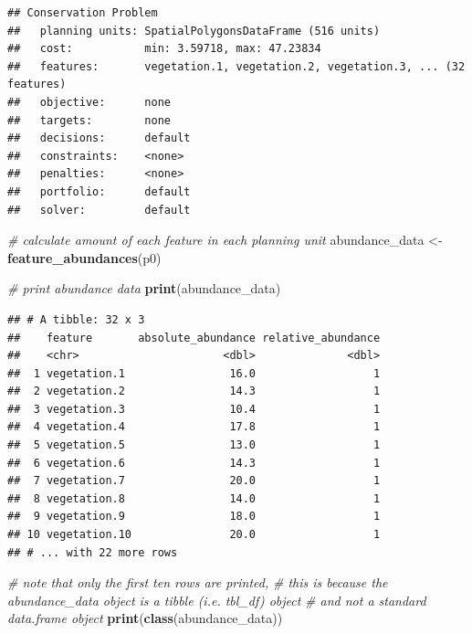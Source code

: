 \documentclass[
  12pt,
]{book}
\newenvironment{Shaded}{\begin{snugshade}}{\end{snugshade}}
\newcommand{\CommentTok}[1]{\textcolor[rgb]{0.56,0.35,0.01}{\textit{#1}}}
\newcommand{\KeywordTok}[1]{\textcolor[rgb]{0.13,0.29,0.53}{\textbf{#1}}}
\newcommand{\NormalTok}[1]{#1}
\newcommand{\StringTok}[1]{\textcolor[rgb]{0.31,0.60,0.02}{#1}}
\begin{document}
\begin{verbatim}
## Conservation Problem
##   planning units: SpatialPolygonsDataFrame (516 units)
##   cost:           min: 3.59718, max: 47.23834
##   features:       vegetation.1, vegetation.2, vegetation.3, ... (32 features)
##   objective:      none
##   targets:        none
##   decisions:      default
##   constraints:    <none>
##   penalties:      <none>
##   portfolio:      default
##   solver:         default
\end{verbatim}

\begin{Shaded}
\begin{Highlighting}[]
\CommentTok{# calculate amount of each feature in each planning unit}
\NormalTok{abundance_data <-}\StringTok{ }\KeywordTok{feature_abundances}\NormalTok{(p0)}

\CommentTok{# print abundance data}
\KeywordTok{print}\NormalTok{(abundance_data)}
\end{Highlighting}
\end{Shaded}

\begin{verbatim}
## # A tibble: 32 x 3
##    feature       absolute_abundance relative_abundance
##    <chr>                      <dbl>              <dbl>
##  1 vegetation.1                16.0                  1
##  2 vegetation.2                14.3                  1
##  3 vegetation.3                10.4                  1
##  4 vegetation.4                17.8                  1
##  5 vegetation.5                13.0                  1
##  6 vegetation.6                14.3                  1
##  7 vegetation.7                20.0                  1
##  8 vegetation.8                14.0                  1
##  9 vegetation.9                18.0                  1
## 10 vegetation.10               20.0                  1
## # ... with 22 more rows
\end{verbatim}

\clearpage

\begin{Shaded}
\begin{Highlighting}[]
\CommentTok{# note that only the first ten rows are printed,}
\CommentTok{# this is because the abundance_data object is a tibble (i.e. tbl_df) object}
\CommentTok{# and not a standard data.frame object}
\KeywordTok{print}\NormalTok{(}\KeywordTok{class}\NormalTok{(abundance_data))}
\end{Highlighting}
\end{Shaded}
\end{document}
